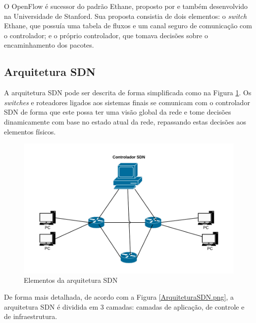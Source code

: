 O OpenFlow é sucessor do padrão Ethane, proposto por  e  também desenvolvido na Universidade de Stanford. Sua proposta consistia de dois elementos: o \emph{switch} Ethane, que possuía uma tabela de fluxos e um canal seguro de comunicação com o controlador; e o próprio controlador, que tomava decisões sobre o encaminhamento dos pacotes.  

\subsection{Arquitetura SDN}

  A arquitetura SDN pode ser descrita de forma simplificada como na Figura \ref{SDN.png}. Os \emph{switches} e roteadores ligados aos sistemas finais se comunicam com o controlador SDN de forma que este possa ter uma visão global da rede e tome decisões dinamicamente com base no estado atual da rede, repassando estas decisões aos elementos físicos.

   \begin{figure}[!h]
	\caption{ Elementos da arquitetura SDN}
  \centering
  \includegraphics[scale=0.3]{Imagens/SDN.png} 
 
  \label{SDN.png}
\end{figure}
 
   De forma mais detalhada, de acordo com a Figura \ref{ArquiteturaSDN.png}, a arquitetura SDN  é dividida em 3 camadas: camadas de aplicação, de controle e de infraestrutura.\cite{Nunes}
   
